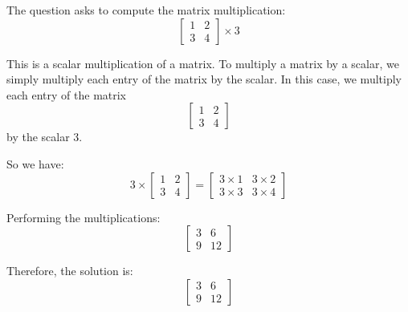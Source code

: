 \documentclass{article}
\begin{document}
\noindent The question asks to compute the matrix multiplication:
\[
\begin{bmatrix}
1 & 2 \\
3 & 4
\end{bmatrix} \times 3
\]

\noindent This is a scalar multiplication of a matrix. To multiply a matrix by a scalar, we simply multiply each entry of the matrix by the scalar. In this case, we multiply each entry of the matrix
\[
\begin{bmatrix}
1 & 2 \\
3 & 4
\end{bmatrix}
\]
by the scalar 3.

\noindent So we have:
\[
3 \times \begin{bmatrix}
1 & 2 \\
3 & 4
\end{bmatrix} = \begin{bmatrix}
3 \times 1 & 3 \times 2 \\
3 \times 3 & 3 \times 4
\end{bmatrix}
\]

\noindent Performing the multiplications:
\[
\begin{bmatrix}
3 & 6 \\
9 & 12
\end{bmatrix}
\]

\noindent Therefore, the solution is:
\[
\begin{bmatrix}
3 & 6 \\
9 & 12
\end{bmatrix}
\]
\end{document}

